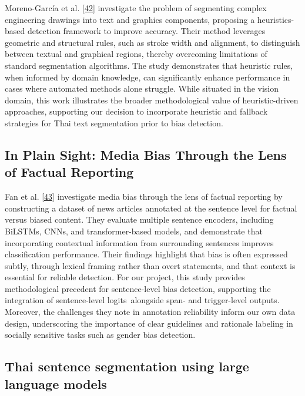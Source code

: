 \documentclass[12pt,oneside,openright,a4paper]{cpe-english-project}
\begin{document}
Moreno-García et al. \hyperlink{bib:ref42}{[42]} investigate the problem of segmenting complex engineering drawings into text and graphics components, proposing a heuristics-based detection framework to improve accuracy. Their method leverages geometric and structural rules, such as stroke width and alignment, to distinguish between textual and graphical regions, thereby overcoming limitations of standard segmentation algorithms. The study demonstrates that heuristic rules, when informed by domain knowledge, can significantly enhance performance in cases where automated methods alone struggle. While situated in the vision domain, this work illustrates the broader methodological value of heuristic-driven approaches, supporting our decision to incorporate heuristic and fallback strategies for Thai text segmentation prior to bias detection.

\subsection{In Plain Sight: Media Bias Through the Lens of Factual Reporting}

Fan et al. \hyperlink{bib:ref43}{[43]} investigate media bias through the lens of factual reporting by constructing a dataset of news articles annotated at the sentence level for factual versus biased content. They evaluate multiple sentence encoders, including BiLSTMs, CNNs, and transformer-based models, and demonstrate that incorporating contextual information from surrounding sentences improves classification performance. Their findings highlight that bias is often expressed subtly, through lexical framing rather than overt statements, and that context is essential for reliable detection. For our project, this study provides methodological precedent for sentence-level bias detection, supporting the integration of sentence-level logits~alongside span- and trigger-level outputs. Moreover, the challenges they note in annotation reliability inform our own data design, underscoring the importance of clear guidelines and rationale labeling in socially sensitive tasks such as gender bias detection.

\subsection{Thai sentence segmentation using large language models}
\end{document}
